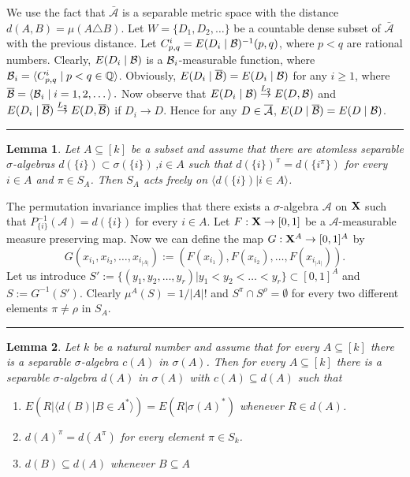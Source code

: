 \documentclass [11pt] {article}
\newcommand{\qed} {\hspace {0.1in} \rule {1.5mm} {3.5mm}}
\newtheorem{lemma}{Lemma}[section]
\def\proof{\smallskip\noindent{\it Proof.} }
\def\cA{\mbox{$\cal A$}}
\def\cB{\mbox{$\cal B$}}
\def\cA{\mbox{$\cal A$}}
\def\cB{\mbox{$\cal B$}}
\def\to{\rightarrow}
\def\xo{{\bf X}}
\def\muo{\mu}
\begin{document}
\proof
  We use the fact that $\bar{\mathcal{A}}$ is a
  separable metric space with the distance $d(A,B)=\mu(A\triangle B)$. Let
  $W=\{D_1,D_2,\dots\}$ be a countable dense subset of $\bar{\mathcal{A}}$
  with the previous distance. Let $C_{p,q}^i=E(D_i\mid \cB)^{-1}(p,q)$,
where $p<q$ are rational numbers. Clearly, $E(D_i\mid \cB)$ is a
$\cB_i$-measurable function, where $\cB_i=\langle C_{p,q}^i\mid
p<q\in \bQ\rangle$. Obviously, $E(D_i\mid \overline{\cB})=
E(D_i\mid \cB)$ for any $i\geq 1$, where
$\overline{\cB}=\langle \cB_i\mid i=1,2,\dots\rangle\,.$
Now observe that $E(D_i\mid \cB)\stackrel {L_2}{\to}
 E(D,\cB)$ and $E(D_i\mid \overline{\cB})\stackrel {L_2}{\to}
 E(D,\overline{\cB})$
if $D_i\to D$. Hence for any $D\in \overline{\cA}$, $E(D\mid\overline{\cB})=
E(D\mid\cB)$.\qed
\begin{lemma}\label{inv1} Let $A\subseteq[k]$ be a subset and assume that
  there are atomless separable $\sigma$-algebras
$d(\{i\})\subset\sigma(\{i\})$\,,$i\in A$
  such that $d(\{i\})^\pi=d(\{i^\pi\})$ for every $i\in A$ and $\pi\in
  S_A$. Then $S_A$ acts freely on $\langle d(\{i\})|i\in A\rangle$.
\end{lemma}

\proof The permutation invariance implies that there exists a
  $\sigma$-algebra $\mathcal{A}$ on $\xo$ such that
  $P_{\{i\}}^{-1}(\mathcal{A})=d(\{i\})$ for every $i\in A$.
  Let $F:\xo\to [0,1]$ be a $\mathcal{A}$-measurable measure
preserving map. Now
  we can define the map $G:\xo^A\to [0,1]^{A}$ by
  $$G(x_{i_1},x_{i_2},\dots,x_{i_{|A|}}):=
(F(x_{i_1}),F(x_{i_2}),\dots,F(x_{i_{|A|}})).$$
Let us introduce $S':=\{(y_1,y_2,\dots,y_r)|y_1<y_2<\dots< y_r\}\subset[0,1]^A$
and $S:=G^{-1}(S')$. Clearly $\muo^A(S)=1/|A|!$
and $S^\pi\cap S^\rho=\emptyset$
for every two different elements $\pi\neq\rho$ in $S_A$.
\qed

\begin{lemma}\label{sep2} Let $k$ be a natural number and assume that for every
  $A\subseteq[k]$ there is a separable $\sigma$-algebra $c(A)$ in
  $\sigma(A)$. Then for every $A\subseteq[k]$ there is a separable
  $\sigma$-algebra $d(A)$ in $\sigma(A)$ with $c(A)\subseteq d(A)$ such that

\begin{enumerate}
\item  $E(R|\langle d(B)|B\in A^*\rangle)=E(R|\sigma(A)^*)$ whenever $R\in
  d(A)$.
\item $d(A)^\pi=d(A^\pi)$ for every element $\pi\in S_k$.
\item $d(B)\subseteq d(A)$ whenever $B\subseteq A$
\end{enumerate}
\end{lemma}
\end{document}
